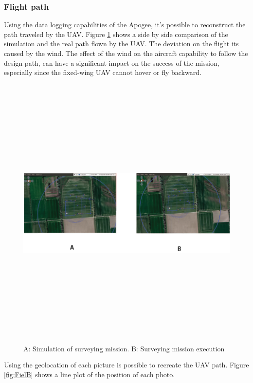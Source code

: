 \subsubsection{Flight path}
Using the data logging capabilities of the Apogee, it's possible to reconstruct the path traveled by the UAV.
Figure \ref{fig:SimVReal} shows a side by side comparison of the simulation and the real path flown by the UAV. The deviation on the flight its caused by the wind. The effect of the wind on the aircraft capability to follow the design path, can have a significant impact on the success of the mission, especially since the fixed-wing UAV cannot hover or fly backward. 
\begin{figure}[H]
\centering
\includegraphics[width=14cm,height=14cm,keepaspectratio]{imagenes/SimVsreallity.png}
\caption{ A: Simulation of surveying mission. B: Surveying mission execution}
\label{fig:SimVReal}
\end{figure}
Using the geolocation of each picture is possible to recreate the UAV path. Figure \ref{fig:FielB} shows a line plot of the position of each photo.
